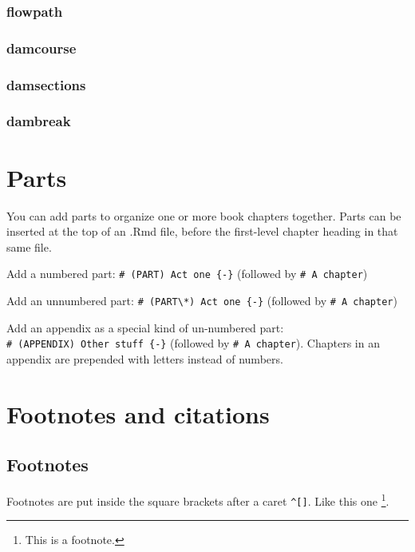 \documentclass[
]{book}
\theoremstyle{definition}
\theoremstyle{definition}
\theoremstyle{definition}
\theoremstyle{definition}
\theoremstyle{remark}
\begin{document}
\subsection{flowpath}\label{flowpath}

\subsection{damcourse}\label{damcourse}

\subsection{damsections}\label{damsections}

\subsection{dambreak}\label{dambreak}

\chapter{Parts}\label{parts}

You can add parts to organize one or more book chapters together. Parts can be inserted at the top of an .Rmd file, before the first-level chapter heading in that same file.

Add a numbered part: \texttt{\#\ (PART)\ Act\ one\ \{-\}} (followed by \texttt{\#\ A\ chapter})

Add an unnumbered part: \texttt{\#\ (PART\textbackslash{}*)\ Act\ one\ \{-\}} (followed by \texttt{\#\ A\ chapter})

Add an appendix as a special kind of un-numbered part: \texttt{\#\ (APPENDIX)\ Other\ stuff\ \{-\}} (followed by \texttt{\#\ A\ chapter}). Chapters in an appendix are prepended with letters instead of numbers.

\chapter{Footnotes and citations}\label{footnotes-and-citations}

\section{Footnotes}\label{footnotes}

Footnotes are put inside the square brackets after a caret \texttt{\^{}{[}{]}}. Like this one \footnote{This is a footnote.}.
\end{document}

